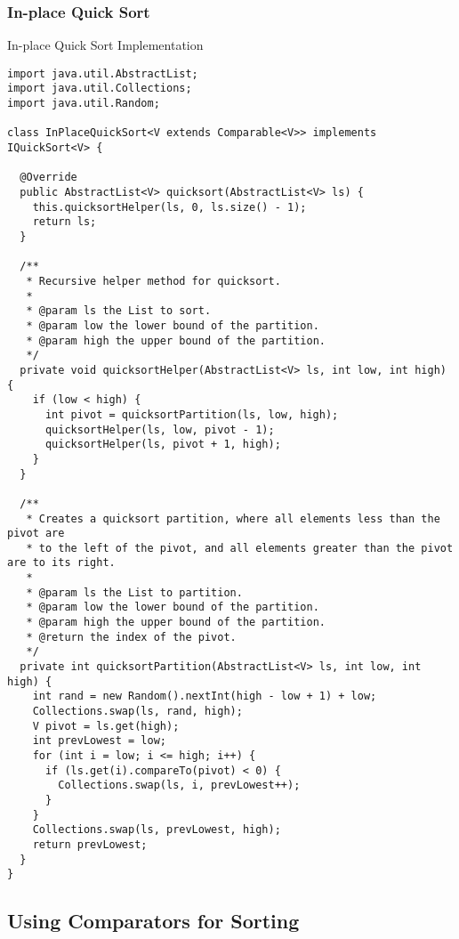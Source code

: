 \subsubsection*{In-place Quick Sort}
\begin{cl}{In-place Quick Sort Implementation}
\begin{lstlisting}[language=MyJava]
import java.util.AbstractList;
import java.util.Collections;
import java.util.Random;

class InPlaceQuickSort<V extends Comparable<V>> implements IQuickSort<V> {

  @Override
  public AbstractList<V> quicksort(AbstractList<V> ls) {
    this.quicksortHelper(ls, 0, ls.size() - 1);
    return ls;
  }

  /**
   * Recursive helper method for quicksort.
   * 
   * @param ls the List to sort.
   * @param low the lower bound of the partition.
   * @param high the upper bound of the partition.
   */
  private void quicksortHelper(AbstractList<V> ls, int low, int high) {
    if (low < high) {
      int pivot = quicksortPartition(ls, low, high);
      quicksortHelper(ls, low, pivot - 1);
      quicksortHelper(ls, pivot + 1, high);
    }
  }

  /**
   * Creates a quicksort partition, where all elements less than the pivot are
   * to the left of the pivot, and all elements greater than the pivot are to its right.
   * 
   * @param ls the List to partition.
   * @param low the lower bound of the partition.
   * @param high the upper bound of the partition.
   * @return the index of the pivot.
   */
  private int quicksortPartition(AbstractList<V> ls, int low, int high) {
    int rand = new Random().nextInt(high - low + 1) + low;
    Collections.swap(ls, rand, high);
    V pivot = ls.get(high);
    int prevLowest = low;
    for (int i = low; i <= high; i++) {
      if (ls.get(i).compareTo(pivot) < 0) {
        Collections.swap(ls, i, prevLowest++);
      }
    }
    Collections.swap(ls, prevLowest, high);
    return prevLowest;
  }
}
\end{lstlisting}
\end{cl}

\subsection*{Using Comparators for Sorting}




